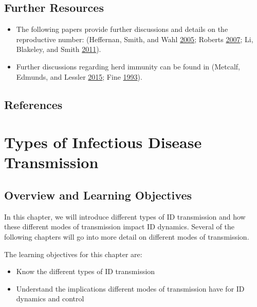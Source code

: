 \documentclass[
]{book}
\providecommand{\tightlist}{%
  \setlength{\itemsep}{0pt}\setlength{\parskip}{0pt}}
\begin{document}
\hypertarget{further-resources-3}{%
\section{Further Resources}\label{further-resources-3}}

\begin{itemize}
\tightlist
\item
  The following papers provide further discussions and details on the reproductive number: (Heffernan, Smith, and Wahl \protect\hyperlink{ref-heffernan05}{2005}; Roberts \protect\hyperlink{ref-roberts07}{2007}; Li, Blakeley, and Smith \protect\hyperlink{ref-li11}{2011}).
\item
  Further discussions regarding herd immunity can be found in (Metcalf, Edmunds, and Lessler \protect\hyperlink{ref-metcalf15}{2015}; Fine \protect\hyperlink{ref-fine93}{1993}).
\end{itemize}

\hypertarget{references-4}{%
\section{References}\label{references-4}}

\hypertarget{types-of-infectious-disease-transmission}{%
\chapter{Types of Infectious Disease Transmission}\label{types-of-infectious-disease-transmission}}

\hypertarget{overview-and-learning-objectives-4}{%
\section{Overview and Learning Objectives}\label{overview-and-learning-objectives-4}}

In this chapter, we will introduce different types of ID transmission and how these different modes of transmission impact ID dynamics. Several of the following chapters will go into more detail on different modes of transmission.

The learning objectives for this chapter are:

\begin{itemize}
\tightlist
\item
  Know the different types of ID transmission
\item
  Understand the implications different modes of transmission have for ID dynamics and control
\end{itemize}
\end{document}
